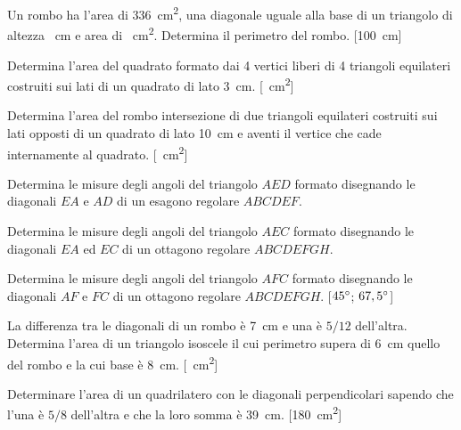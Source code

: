 \begin{multicols}{2}
\begin{esercizio}
\label{ese:7.53}
Un rombo ha l'area di 336~cm\textsuperscript{2}, una diagonale uguale alla base di un triangolo di altezza ~cm e area di ~cm\textsuperscript{2}. Determina il perimetro del rombo.
[100~cm]
\end{esercizio}

\begin{esercizio}
\label{ese:7.54}
Determina l'area del quadrato formato dai 4 vertici liberi di 4 triangoli equilateri costruiti sui lati di un quadrato di lato 3~cm.
[~cm\textsuperscript{2}]
\end{esercizio}

\begin{esercizio}
\label{ese:7.55}
Determina l'area del rombo intersezione di due triangoli equilateri costruiti sui lati opposti di un quadrato di lato 10~cm e aventi il vertice che cade internamente al quadrato.
[~cm\textsuperscript{2}]
\end{esercizio}

\begin{esercizio}
\label{ese:7.56}
Determina le misure degli angoli del triangolo $AED$ formato disegnando le diagonali $EA$ e $AD$ di un esagono regolare $ABCDEF$.
\end{esercizio}

\begin{esercizio}
\label{ese:7.57}
Determina le misure degli angoli del triangolo $AEC$ formato disegnando le diagonali $EA$ ed $EC$ di un ottagono regolare $ABCDEFGH$.
\end{esercizio}

\begin{esercizio}
\label{ese:7.58}
Determina le misure degli angoli del triangolo $AFC$ formato disegnando le diagonali $AF$ e $FC$ di un ottagono regolare $ABCDEFGH$.
[$45{}^{\circ}$; $67,5{}^{\circ}$]
\end{esercizio}

\begin{esercizio}
\label{ese:7.59}
La differenza tra le diagonali di un rombo è 7~cm e una è $5/12$ dell'altra. Determina l'area di un triangolo isoscele il cui perimetro supera di 6~cm quello del rombo e la cui base è 8~cm. [~cm\textsuperscript{2}]
\end{esercizio}

\begin{esercizio}
\label{ese:7.60}
Determinare l'area di un quadrilatero con le diagonali perpendicolari sapendo che l'una è $5/8$ dell'altra e che la loro somma è 39~cm.
[180~cm\textsuperscript{2}]
\end{esercizio}


\end{multicols}
